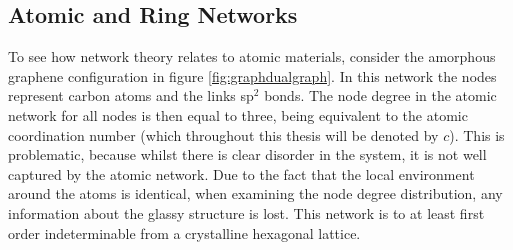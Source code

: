 \subsection{Atomic and Ring Networks}
\label{s:atomringnetworks}

To see how network theory relates to atomic materials, consider the amorphous graphene configuration in figure \ref{fig:graphdualgraph}.
In this network the nodes represent carbon atoms and the links sp$^2$ bonds.
The node degree in the atomic network for all nodes is then equal to three, being equivalent to the atomic coordination number (which throughout this thesis will be denoted by $c$).
This is problematic, because whilst there is clear disorder in the system, it is not well captured by the atomic network.
Due to the fact that the local environment around the atoms is identical, when examining the node degree distribution, any information about the glassy structure is lost.
This network is to at least first order indeterminable from a crystalline hexagonal lattice.

